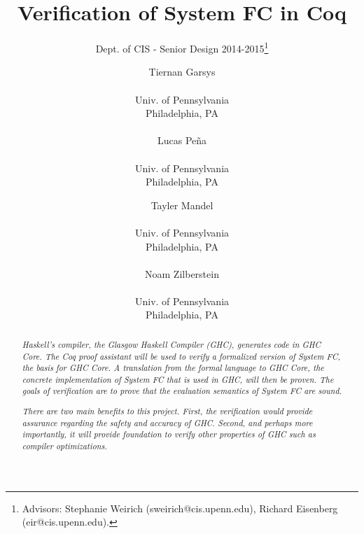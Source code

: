 \documentclass{sig-alternate}
\begin{document}
 

\title{Verification of System FC in Coq}
\subtitle{Dept. of CIS - Senior Design 2014-2015\thanks{Advisors: Stephanie Weirich (sweirich@cis.upenn.edu), Richard Eisenberg (eir@cis.upenn.edu).}}
\author{
  Tiernan Garsys \\  \\ Univ. of Pennsylvania \\ Philadelphia, PA\\\\
  Lucas Pe\~{n}a \\  \\ Univ. of Pennsylvania \\ Philadelphia, PA
  \and
  Tayler Mandel \\  \\ Univ. of Pennsylvania \\ Philadelphia, PA\\\\
  Noam Zilberstein \\  \\ Univ. of Pennsylvania \\ Philadelphia, PA
}
\date{}
\maketitle

\begin{abstract}
  \textit{
Haskell's compiler, the Glasgow Haskell Compiler (GHC), generates code in GHC Core. The Coq proof assistant will be used to verify a formalized version of System FC, the basis for GHC Core. A translation from the formal language to GHC Core, the concrete implementation of System FC that is used in GHC, will then be proven. The goals of verification are to prove that the evaluation semantics of System FC are sound.
  }

  \textit{
There are two main benefits to this project. First, the verification would provide assurance regarding the safety and accuracy of GHC. Second, and perhaps more importantly, it will provide foundation to verify other properties of GHC such as compiler optimizations.
 }
\end{abstract}
\end{document}
